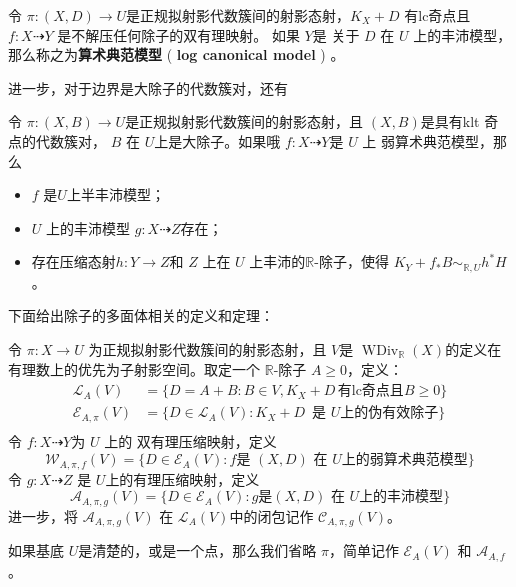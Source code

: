 \begin{definition}
	令 $ \pi:(X, D)\to U $是正规拟射影代数簇间的射影态射，$ K_X+D $ 有lc奇点且$ f: X\dashrightarrow Y $ 是不解压任何除子的双有理映射。 如果 $ Y $是 关于 $D$ 在 $U$ 上的丰沛模型，那么称之为\textbf{算术典范模型} ( \textbf{log canonical model} ) 。
\end{definition}

进一步，对于边界是大除子的代数簇对，还有
\begin{lemma}\citet[lemma 3.9.3]{BCHM10} 令 $ \pi:(X,B)\to U $是正规拟射影代数簇间的射影态射，且 $(X, B)$是具有klt 奇点的代数簇对，  $B$ 在 $U$上是大除子。如果哦 $f:X\dashrightarrow Y$是 $U$ 上 弱算术典范模型，那么
	\begin{itemize}
		\item $f$ 是$U$上半丰沛模型；
		\item  $U$ 上的丰沛模型  $g:X \dashrightarrow Z$存在；
		\item  存在压缩态射$h:Y\to Z$和 $Z$ 上在 $U$ 上丰沛的$\mathbb{R}$-除子，使得 $K_{Y}+f_*B\sim_{\mathbb{R},U} h^*H$。
	\end{itemize}
\end{lemma}
下面给出除子的多面体相关的定义和定理：
\begin{definition}\label{polytopeofdivisor}
	\citet[Definition 1.1.4]{BCHM10} 令 $ \pi: X\to U $ 为正规拟射影代数簇间的射影态射，且 $ V $是 $ \operatorname{WDiv}_{\mathbb{R}}(X) $的定义在有理数上的优先为子射影空间。取定一个 $ \mathbb{R} $-除子 $ A\geqslant 0 $，定义：
	\[
		\begin{aligned}
			\mathcal{L}_A(V)       & =\{D=A+B:B \in V,  K_X+D\, \text{有lc奇点且} B\geqslant0 \} \\
    \mathcal{E}_{A,\pi}(V) & =\{D\in \mathcal{L}_A(V): K_X+D\, \text{ 是 } U \text{上的伪有效除子}\}  \\
		\end{aligned}
	\]
	令 $ f:X \dashrightarrow Y$为 $U$ 上的 双有理压缩映射，定义
	\[ \mathcal{W}_{A,\pi,f}(V)=\{D\in \mathcal{E}_{A}(V): f \text{是   } (X,D) \text{ 在 }U \text{上的弱算术典范模型}\} \]
	令 $g:X\dashrightarrow Z  $ 是 $ U $上的有理压缩映射，定义
	\[ \mathcal{A}_{A,\pi,g}(V)=\{D\in \mathcal{E}_{A}(V): g \text{是} (X,D) \text{ 在 }U \text{上的丰沛模型}\} \]
	进一步，将 $ \mathcal{A}_{A,\pi,g}(V) $ 在 $\mathcal{L}_{A}(V)$中的闭包记作 $ \mathcal{C}_{A,\pi,g}(V) $。

	如果基底 $U$是清楚的，或是一个点，那么我们省略 $\pi$，简单记作 $\mathcal{E}_{A}(V)$ 和 $\mathcal{A}_{A,f}$。
\end{definition}

